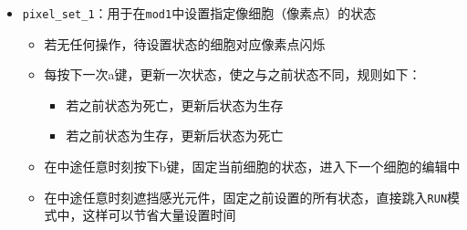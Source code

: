 \documentclass[11pt]{article}
\providecommand{\tightlist}{%
      \setlength{\itemsep}{0pt}\setlength{\parskip}{0pt}}
\begin{document}
\begin{itemize}
\tightlist
\item
  \texttt{pixel\_set\_1}：用于在\texttt{mod1}中设置指定像细胞（像素点）的状态

  \begin{itemize}
  \tightlist
  \item
    若无任何操作，待设置状态的细胞对应像素点闪烁
  \item
    每按下一次a键，更新一次状态，使之与之前状态不同，规则如下：

    \begin{itemize}
    \tightlist
    \item
      若之前状态为死亡，更新后状态为生存
    \item
      若之前状态为生存，更新后状态为死亡
    \end{itemize}
  \item
    在中途任意时刻按下b键，固定当前细胞的状态，进入下一个细胞的编辑中
  \item
    在中途任意时刻遮挡感光元件，固定之前设置的所有状态，直接跳入\texttt{RUN}模式中，这样可以节省大量设置时间
  \end{itemize}
\end{itemize}
\end{document}
